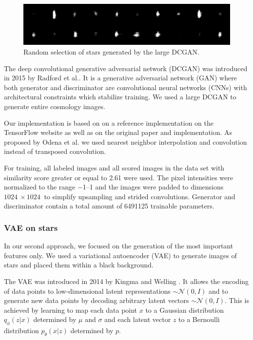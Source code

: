 \documentclass[10pt,conference,compsocconf]{IEEEtran}
\begin{document}
\begin{figure}[ht]
    \centering
    \includegraphics[width=\columnwidth]{assets/star_ensemble_large_resized.png}
    \caption{Random selection of stars generated by the large DCGAN.}
    \label{fig:dcgan_stars}
\end{figure}

The deep convolutional generative adversarial network (DCGAN) was introduced in 2015 by Radford et al.\@ \cite{Radford}. It is a generative adversarial network (GAN) where both generator and discriminator are convolutional neural networks (CNNs) with architectural constraints which stabilize training. We used a large DCGAN to generate entire cosmology images. 

Our implementation is based on on a reference implementation on the TensorFlow website \cite{dcgantf} as well as on the original paper and implementation. As proposed by Odena et al.\@ \cite{Odena} we used nearest neighbor interpolation and convolution instead of transposed convolution.

For training, all labeled images and all scored images in the data set with similarity score greater or equal to \SI{2.61}{} were used. The pixel intensities were normalized to the range \SIrange{-1}{1}{} and the images were padded to dimensions $\SI{1024}{}\times\SI{1024}{}$ to simplify upsampling and strided convolutions. Generator and discriminator contain a total amount of \SI{6491125}{} trainable parameters.

\subsubsection{VAE on stars} %
In our second approach, we focused on the generation of the most important features only. We used a variational autoencoder (VAE) to generate images of stars and placed them within a black background. 

The VAE was introduced in 2014 by Kingma and Welling \cite{DBLP:journals/corr/KingmaW13}. It allows the encoding of data points to low-dimensional latent representations  $\sim\mathcal{N}(0, I)$ and to generate new data points by decoding arbitrary latent vectors $\sim\mathcal{N}(0, I)$. This is achieved by learning to map each data point $x$ to a Gaussian distribution $q_{\phi}(z|x)$ determined by $\mu$ and $\sigma$ and each latent vector $z$ to a Bernoulli distribution $p_{\theta}(x|z)$ determined by $p$.
 
\end{document}
